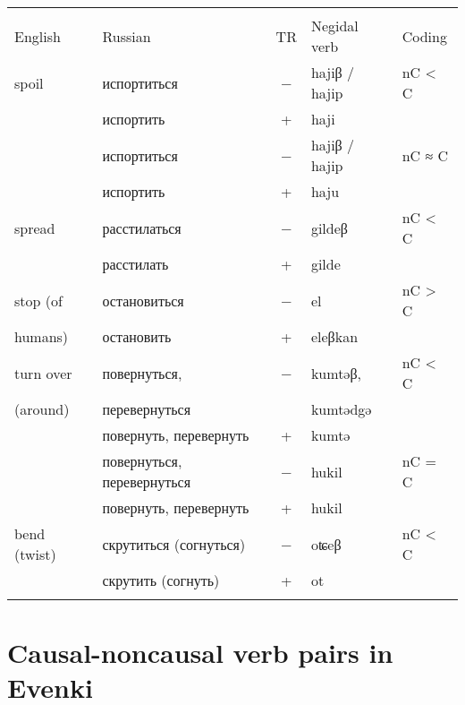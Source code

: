 \documentclass[output=paper,colorlinks,citecolor=brown]{langscibook}
\begin{document}
\begin{paperappendix}
\begin{table}[H]
\begin{tabularx}{\textwidth}{ l  l c Q l}
\lsptoprule
{} & \\\cmidrule(lr){1-2}
English  & Russian &	TR &	Negidal verb &	Coding\\
\midrule
spoil &	испортиться &	− &	hajiβ / hajip & 	nC < C\\
 &	испортить &	+ &	haji &	\\
 &	испортиться &	− &	hajiβ / hajip &	nC ≈ C\\
 &	испортить &	+ &	haju &	\\
 \midrule
 spread &	расстилаться &	− &	gildeβ &	nC < C\\
 &	расстилать &	+ &	gilde &	\\
\midrule
stop (of &	остановиться &	− &	el &	nC > C\\
humans) &	остановить &	+ &	eleβkan &	\\
 \midrule
turn over  &	повернуться,  &	− &	kumtəβ,  &	nC < C\\
(around)  & перевернуться &  & kumtədgə \\
 &	повернуть, перевернуть &	+ &	kumtə	\\
 &	повернуться, перевернуться &	− &	hukil &	nC = C\\
 &	повернуть, перевернуть &	+ &	hukil &	\\
\midrule
bend (twist) &	скрутиться (согнуться) &	− &	oʨeβ &	nC < C\\
 &	скрутить (согнуть) &	+ &	ot &	\\
  \lspbottomrule
\end{tabularx}
\label{table:2Appendix2c}
\end{table}



\section{Causal-noncausal verb pairs in Evenki}\label{Appendix3}



\end{paperappendix}
\end{document}

